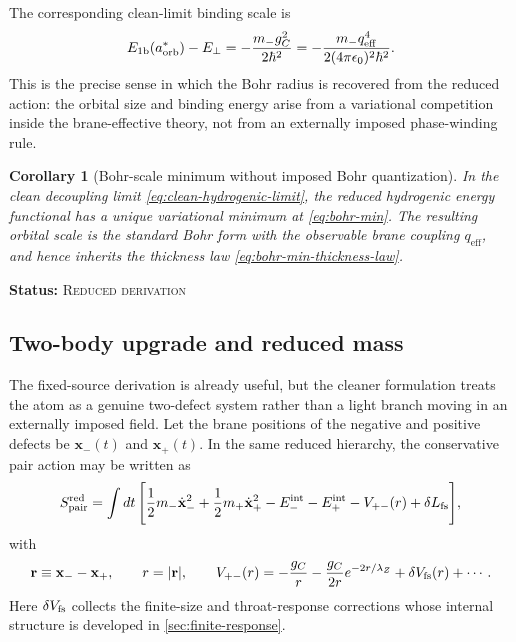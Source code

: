 \documentclass[11pt]{article}
\theoremstyle{plain}
\newtheorem{corollary}[theorem]{Corollary}
\theoremstyle{definition}
\theoremstyle{remark}
\newcommand{\statusReduced}{\textsc{Reduced derivation}}
\newcommand{\claimstatus}[1]{\par\smallskip\noindent\textbf{Status:} #1\par\smallskip}
\newcommand{\aorb}{a_{\mathrm{orb}}}
\newcommand{\qeff}{q_{\mathrm{eff}}}
\begin{document}
The corresponding clean-limit binding scale is
\begin{equation}
E_{1\rm b}(\aorb^*)-E_\perp
=
-\frac{m_- g_C^2}{2\hbar^2}
=
-\frac{m_-\qeff^4}{2(4\pi\epsilon_0)^2\hbar^2}.
\label{eq:binding-scale-fixed-source}
\end{equation}
This is the precise sense in which the Bohr radius is recovered from the reduced action: the orbital size and binding energy arise from a variational competition inside the brane-effective theory, not from an externally imposed phase-winding rule.

\begin{corollary}[Bohr-scale minimum without imposed Bohr quantization]\label{cor:bohr-minimum}
In the clean decoupling limit \cref{eq:clean-hydrogenic-limit}, the reduced hydrogenic energy functional has a unique variational minimum at \cref{eq:bohr-min}. The resulting orbital scale is the standard Bohr form with the observable brane coupling $\qeff$, and hence inherits the thickness law \cref{eq:bohr-min-thickness-law}.
\end{corollary}
\claimstatus{\statusReduced}

\subsection{Two-body upgrade and reduced mass}\label{subsec:two-body-upgrade}

The fixed-source derivation is already useful, but the cleaner formulation treats the atom as a genuine two-defect system rather than a light branch moving in an externally imposed field. Let the brane positions of the negative and positive defects be $\mathbf x_-(t)$ and $\mathbf x_+(t)$. In the same reduced hierarchy, the conservative pair action may be written as
\begin{equation}
S_{\rm pair}^{\rm red}
=
\int dt\,
\Bigg[
\frac12 m_- \dot{\mathbf x}_-^{2}
+\frac12 m_+ \dot{\mathbf x}_+^{2}
-E_-^{\rm int}-E_+^{\rm int}
-V_{+-}(r)
+\delta L_{\rm fs}
\Bigg],
\label{eq:pair-reduced-action}
\end{equation}
with
\begin{equation}
\mathbf r\equiv \mathbf x_- - \mathbf x_+,
\qquad r=|\mathbf r|,
\qquad
V_{+-}(r)
=
-\frac{g_C}{r}
-\frac{g_C}{2r}e^{-2r/\lambda_Z}
+\delta V_{\rm fs}(r)
+\cdots.
\label{eq:pair-potential}
\end{equation}
Here $\delta V_{\rm fs}$ collects the finite-size and throat-response corrections whose internal structure is developed in \cref{sec:finite-response}.
\end{document}
